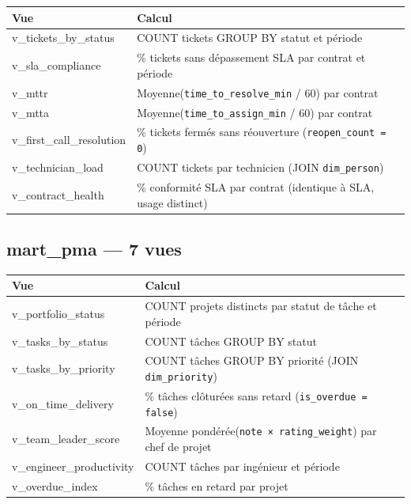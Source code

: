 \documentclass[a4paper,12pt]{article}
\begin{document}
\begin{tabularx}{\textwidth}{>{\ttfamily\footnotesize}p{5cm} >{\footnotesize}X}
\toprule
\textbf{Vue} & \textbf{Calcul} \\
\midrule
v\_tickets\_by\_status     & COUNT tickets GROUP BY statut et période \\
v\_sla\_compliance         & \% tickets sans dépassement SLA par contrat et période \\
v\_mttr                    & Moyenne(\texttt{time\_to\_resolve\_min} / 60) par contrat \\
v\_mtta                    & Moyenne(\texttt{time\_to\_assign\_min} / 60) par contrat \\
v\_first\_call\_resolution & \% tickets fermés sans réouverture (\texttt{reopen\_count = 0}) \\
v\_technician\_load        & COUNT tickets par technicien (JOIN \texttt{dim\_person}) \\
v\_contract\_health        & \% conformité SLA par contrat (identique à SLA, usage distinct) \\
\bottomrule
\end{tabularx}

\subsection{mart\_pma — 7 vues}

\begin{tabularx}{\textwidth}{>{\ttfamily\footnotesize}p{5cm} >{\footnotesize}X}
\toprule
\textbf{Vue} & \textbf{Calcul} \\
\midrule
v\_portfolio\_status        & COUNT projets distincts par statut de tâche et période \\
v\_tasks\_by\_status        & COUNT tâches GROUP BY statut \\
v\_tasks\_by\_priority      & COUNT tâches GROUP BY priorité (JOIN \texttt{dim\_priority}) \\
v\_on\_time\_delivery       & \% tâches clôturées sans retard (\texttt{is\_overdue = false}) \\
v\_team\_leader\_score      & Moyenne pondérée(\texttt{note × rating\_weight}) par chef de projet \\
v\_engineer\_productivity   & COUNT tâches par ingénieur et période \\
v\_overdue\_index           & \% tâches en retard par projet \\
\bottomrule
\end{tabularx}
\end{document}
